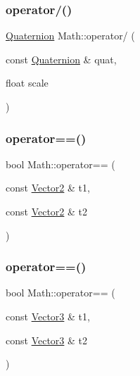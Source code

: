 \mbox{\label{namespace_math_a41131259cf64f7c0ae609d2d0538da66}} 
\subsubsection{\texorpdfstring{operator/()}{operator/()}\hspace{0.1cm}{\footnotesize\ttfamily [7/7]}}
{\footnotesize\ttfamily \mbox{\hyperlink{struct_math_1_1_quaternion}{Quaternion}} Math\+::operator/ (\begin{DoxyParamCaption}\item[{const \mbox{\hyperlink{struct_math_1_1_quaternion}{Quaternion}} \&}]{quat,  }\item[{float}]{scale }\end{DoxyParamCaption})}

\mbox{\label{namespace_math_af4687bc70508587a7473bab655a2b2a9}} 
\subsubsection{\texorpdfstring{operator==()}{operator==()}\hspace{0.1cm}{\footnotesize\ttfamily [1/6]}}
{\footnotesize\ttfamily bool Math\+::operator== (\begin{DoxyParamCaption}\item[{const \mbox{\hyperlink{struct_math_1_1_vector2}{Vector2}} \&}]{t1,  }\item[{const \mbox{\hyperlink{struct_math_1_1_vector2}{Vector2}} \&}]{t2 }\end{DoxyParamCaption})}

\mbox{\label{namespace_math_a68e85675a519a429e4e5650bb2613bc0}} 
\subsubsection{\texorpdfstring{operator==()}{operator==()}\hspace{0.1cm}{\footnotesize\ttfamily [2/6]}}
{\footnotesize\ttfamily bool Math\+::operator== (\begin{DoxyParamCaption}\item[{const \mbox{\hyperlink{struct_math_1_1_vector3}{Vector3}} \&}]{t1,  }\item[{const \mbox{\hyperlink{struct_math_1_1_vector3}{Vector3}} \&}]{t2 }\end{DoxyParamCaption})}

